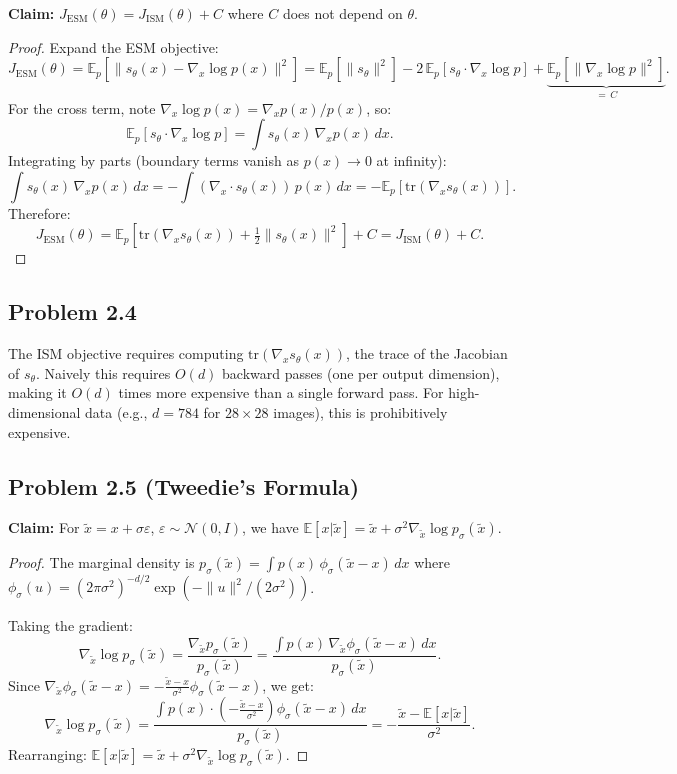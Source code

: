 \documentclass[11pt]{article}
\begin{document}
\textbf{Claim:} $J_\mathrm{ESM}(\theta) = J_\mathrm{ISM}(\theta) + C$ where $C$ does not depend on $\theta$.

\begin{proof}
Expand the ESM objective:
\[
J_\mathrm{ESM}(\theta) = \mathbb{E}_p\!\left[\|s_\theta(x) - \nabla_x \log p(x)\|^2\right] = \mathbb{E}_p\!\left[\|s_\theta\|^2\right] - 2\,\mathbb{E}_p\!\left[s_\theta \cdot \nabla_x \log p\right] + \underbrace{\mathbb{E}_p\!\left[\|\nabla_x \log p\|^2\right]}_{=\,C}.
\]
For the cross term, note $\nabla_x \log p(x) = \nabla_x p(x)/p(x)$, so:
\[
\mathbb{E}_p[s_\theta \cdot \nabla_x \log p] = \int s_\theta(x)\, \nabla_x p(x)\, dx.
\]
Integrating by parts (boundary terms vanish as $p(x) \to 0$ at infinity):
\[
\int s_\theta(x)\, \nabla_x p(x)\, dx = -\int (\nabla_x \cdot s_\theta(x))\, p(x)\, dx = -\mathbb{E}_p[\mathrm{tr}(\nabla_x s_\theta(x))].
\]
Therefore:
\[
J_\mathrm{ESM}(\theta) = \mathbb{E}_p\!\left[\mathrm{tr}(\nabla_x s_\theta(x)) + \tfrac{1}{2}\|s_\theta(x)\|^2\right] + C = J_\mathrm{ISM}(\theta) + C.
\]
\end{proof}

\subsection*{Problem 2.4}

The ISM objective requires computing $\mathrm{tr}(\nabla_x s_\theta(x))$, the trace of the Jacobian of $s_\theta$. Naively this requires $O(d)$ backward passes (one per output dimension), making it $O(d)$ times more expensive than a single forward pass. For high-dimensional data (e.g., $d = 784$ for $28\times28$ images), this is prohibitively expensive.

\subsection*{Problem 2.5 (Tweedie's Formula)}

\textbf{Claim:} For $\tilde{x} = x + \sigma \varepsilon$, $\varepsilon \sim \mathcal{N}(0,I)$, we have $\mathbb{E}[x|\tilde{x}] = \tilde{x} + \sigma^2 \nabla_{\tilde{x}} \log p_\sigma(\tilde{x})$.

\begin{proof}
The marginal density is $p_\sigma(\tilde{x}) = \int p(x)\, \phi_\sigma(\tilde{x}-x)\, dx$ where $\phi_\sigma(u) = (2\pi\sigma^2)^{-d/2}\exp(-\|u\|^2/(2\sigma^2))$.

Taking the gradient:
\[
\nabla_{\tilde{x}} \log p_\sigma(\tilde{x}) = \frac{\nabla_{\tilde{x}} p_\sigma(\tilde{x})}{p_\sigma(\tilde{x})} = \frac{\int p(x)\, \nabla_{\tilde{x}} \phi_\sigma(\tilde{x}-x)\, dx}{p_\sigma(\tilde{x})}.
\]
Since $\nabla_{\tilde{x}} \phi_\sigma(\tilde{x}-x) = -\frac{\tilde{x}-x}{\sigma^2}\phi_\sigma(\tilde{x}-x)$, we get:
\[
\nabla_{\tilde{x}} \log p_\sigma(\tilde{x}) = \frac{\int p(x)\cdot\left(-\frac{\tilde{x}-x}{\sigma^2}\right)\phi_\sigma(\tilde{x}-x)\,dx}{p_\sigma(\tilde{x})} = -\frac{\tilde{x} - \mathbb{E}[x|\tilde{x}]}{\sigma^2}.
\]
Rearranging: $\mathbb{E}[x|\tilde{x}] = \tilde{x} + \sigma^2 \nabla_{\tilde{x}} \log p_\sigma(\tilde{x})$.
\end{proof}
\end{document}
